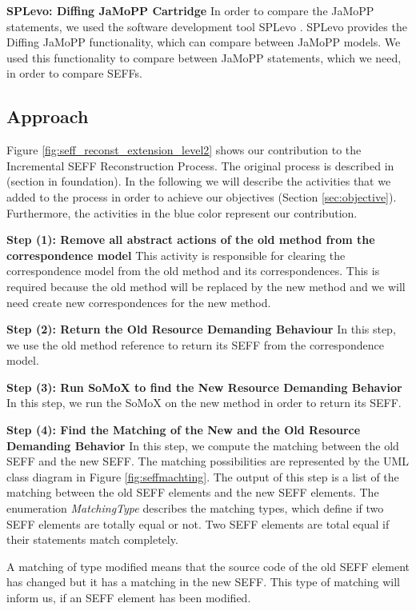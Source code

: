 \textbf{SPLevo: Diffing JaMoPP Cartridge}
In order to compare the JaMoPP statements, we used the software development tool SPLevo \cite{klatt2016consolidation}. SPLevo provides the Diffing JaMoPP functionality, which can compare between JaMoPP models. We used this functionality to compare between JaMoPP statements, which we need, in order to compare SEFFs.

\subsection{Approach}
\label{sec:approach}
Figure \ref{fig:seff_reconst_extension_level2} shows our contribution to the Incremental SEFF Reconstruction Process. The original process is described in (section in foundation). In the following we will describe the activities that we added to the process in order to achieve our objectives (Section \ref{sec:objective}). Furthermore, the activities in the blue color represent our contribution.

\textbf{Step (1): Remove all abstract actions of the old method from the correspondence model}
This activity is responsible for clearing the correspondence model from the old method and its correspondences. This is required because the old method will be replaced by the new method and we will need create new correspondences for the new method.

\textbf{Step (2): Return the Old Resource Demanding Behaviour}
In this step, we use the old method reference to return its SEFF from the correspondence model.

\textbf{Step (3): Run SoMoX to find the New Resource Demanding Behavior}
In this step, we run the SoMoX on the new method in order to return its SEFF. 

\textbf{Step (4): Find the Matching of the New and the Old Resource Demanding Behavior}
In this step, we compute the matching between the old SEFF and the new SEFF. The matching possibilities are represented by the UML class diagram in Figure \ref{fig:seffmachting}.  The output of this step is a list of the matching between the old SEFF elements and the new SEFF elements. The enumeration \textit{MatchingType} describes the matching types, which define if two SEFF elements are totally equal or not. Two SEFF elements are total equal if their statements match completely. 

A matching of type modified means that the source code of the old SEFF element has changed but it has a matching in the new SEFF. This type of matching will inform us, if an SEFF element has been modified.

